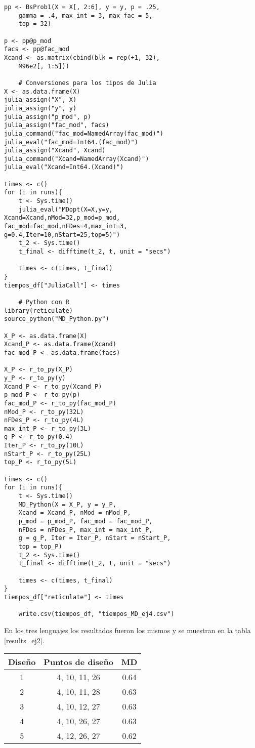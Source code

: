 \begin{verbatim}
pp <- BsProb1(X = X[, 2:6], y = y, p = .25, 
	gamma = .4, max_int = 3, max_fac = 5, 
	top = 32)
	
p <- pp@p_mod
facs <- pp@fac_mod
Xcand <- as.matrix(cbind(blk = rep(+1, 32), 
	M96e2[, 1:5]))
	
	# Conversiones para los tipos de Julia
X <- as.data.frame(X)
julia_assign("X", X)
julia_assign("y", y)
julia_assign("p_mod", p)
julia_assign("fac_mod", facs)
julia_command("fac_mod=NamedArray(fac_mod)")
julia_eval("fac_mod=Int64.(fac_mod)")
julia_assign("Xcand", Xcand)
julia_command("Xcand=NamedArray(Xcand)")
julia_eval("Xcand=Int64.(Xcand)")
	
times <- c()
for (i in runs){
	t <- Sys.time()
	julia_eval("MDopt(X=X,y=y, 
Xcand=Xcand,nMod=32,p_mod=p_mod, 
fac_mod=fac_mod,nFDes=4,max_int=3, 
g=0.4,Iter=10,nStart=25,top=5)")
	t_2 <- Sys.time()
	t_final <- difftime(t_2, t, unit = "secs")
	
	times <- c(times, t_final)
}
tiempos_df["JuliaCall"] <- times
	
	# Python con R
library(reticulate)
source_python("MD_Python.py")
	
X_P <- as.data.frame(X)
Xcand_P <- as.data.frame(Xcand)
fac_mod_P <- as.data.frame(facs)
	
X_P <- r_to_py(X_P)
y_P <- r_to_py(y) 
Xcand_P <- r_to_py(Xcand_P)
p_mod_P <- r_to_py(p)
fac_mod_P <- r_to_py(fac_mod_P)
nMod_P <- r_to_py(32L)
nFDes_P <- r_to_py(4L)
max_int_P <- r_to_py(3L)
g_P <- r_to_py(0.4)
Iter_P <- r_to_py(10L)
nStart_P <- r_to_py(25L)
top_P <- r_to_py(5L)
	
times <- c()
for (i in runs){
	t <- Sys.time()
	MD_Python(X = X_P, y = y_P, 
	Xcand = Xcand_P, nMod = nMod_P, 
	p_mod = p_mod_P, fac_mod = fac_mod_P, 
	nFDes = nFDes_P, max_int = max_int_P, 
	g = g_P, Iter = Iter_P, nStart = nStart_P, 
	top = top_P)
	t_2 <- Sys.time()
	t_final <- difftime(t_2, t, unit = "secs")

	times <- c(times, t_final)
}
tiempos_df["reticulate"] <- times
	
	write.csv(tiempos_df, "tiempos_MD_ej4.csv")
\end{verbatim} 

En los tres lenguajes los resultados fueron los mismos y se muestran en la tabla \ref{results_ej2}.

\begin{center}
	\begin{tabular}{cc|c}
		Diseño & Puntos de diseño & MD \\
		\hline
		1 & 4, 10, 11, 26 & 0.64 \\
		
		2 & 4, 10, 11, 28 & 0.63 \\
		
		3 & 4, 10, 12, 27 & 0.63 \\
		
		4 & 4, 10, 26, 27 & 0.63 \\
		
		5 & 4, 12, 26, 27 & 0.62 \\
		
	\end{tabular}
	 \label{results_ej2}
\end{center}

